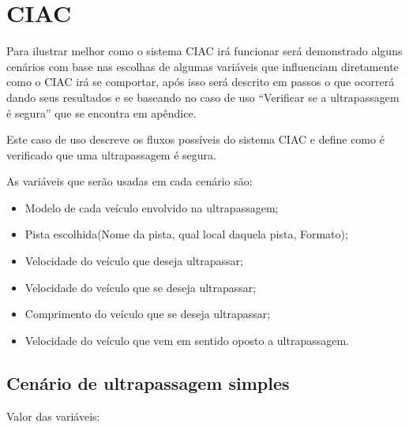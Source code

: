 \chapter{CIAC}

Para ilustrar melhor como o sistema CIAC irá funcionar será demonstrado alguns cenários com base nas escolhas de algumas variáveis que influenciam diretamente como o CIAC irá se comportar, após isso será descrito em passos o que ocorrerá dando seus resultados e se baseando no caso de uso “Verificar se a ultrapassagem é segura” que se encontra em apêndice. 

Este caso de uso descreve os fluxos possíveis do sistema CIAC e define como é verificado que uma ultrapassagem é segura. 

As variáveis que serão usadas em cada cenário são:

\begin{itemize}
	\item Modelo de cada veículo envolvido na ultrapassagem;
	\item Pista escolhida(Nome da pista, qual local daquela pista, Formato);
	\item Velocidade do veículo que deseja ultrapassar;
	\item Velocidade do veículo que se deseja ultrapassar;
	\item Comprimento do veículo que se deseja ultrapassar;
	\item Velocidade do veículo que vem em sentido oposto a ultrapassagem.
\end{itemize}

\section{Cenário de ultrapassagem simples}

Valor das variáveis:

